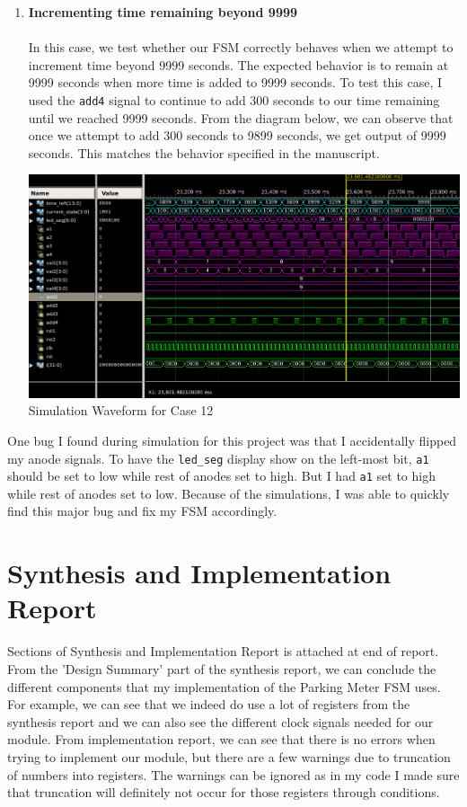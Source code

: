 \documentclass{article}
\begin{document}
\begin{enumerate}
\begin{center}
        \caption{Simulation Waveform for Case 11}
    \end{center}
    \item \textbf{Incrementing time remaining beyond 9999} \\ \\
    In this case, we test whether our FSM correctly behaves when we attempt to increment time beyond 9999 seconds. The expected behavior is to remain at 9999 seconds when more time is added to 9999 seconds. To test this case, I used the \texttt{add4} signal to continue to add 300 seconds to our time remaining until we reached 9999 seconds. From the diagram below, we can observe that once we attempt to add 300 seconds to 9899 seconds, we get output of 9999 seconds. This matches the behavior specified in the manuscript.
    \begin{center}
        \includegraphics[scale=0.4]{waveform-12.png} \\
        \caption{Simulation Waveform for Case 12}
    \end{center}
\end{enumerate}
One bug I found during simulation for this project was that I accidentally flipped my anode signals. To have the \texttt{led\_seg} display show on the left-most bit, \texttt{a1} should be set to low while rest of anodes set to high. But I had \texttt{a1} set to high while rest of anodes set to low. Because of the simulations, I was able to quickly find this major bug and fix my FSM accordingly. 

\section{Synthesis and Implementation Report}
Sections of Synthesis and Implementation Report is attached at end of report.  From the 'Design Summary' part of the synthesis report, we can conclude the different components that my implementation of the Parking Meter FSM uses. For example, we can see that we indeed do use a lot of registers from the synthesis report and we can also see the different clock signals needed for our module. From implementation report, we can see that there is no errors when trying to implement our module, but there are a few warnings due to truncation of numbers into registers. The warnings can be ignored as in my code I made sure that truncation will definitely not occur for those registers through conditions.
\end{document}
